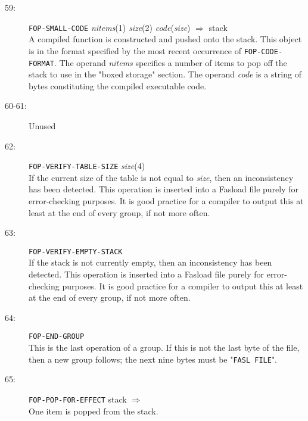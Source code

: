 \begin{description}
\item[59:] \hspace{2em} {\tt FOP-SMALL-CODE} \hspace{2em} {\it nitems}(1) \hspace{2em} {\it size}(2) \hspace{2em}
{\it code}({\it size}) \hspace{2em} $\Rightarrow$ \hspace{2em} stack \\
A compiled function is constructed and pushed onto the stack.
This object is in the format specified by the most recent
occurrence of {\tt FOP-CODE-FORMAT}.
The operand {\it nitems} specifies a number of items to pop off
the stack to use in the "boxed storage" section.  The operand {\it code}
is a string of bytes constituting the compiled executable code.

\item[60-61:] Unused

\item[62:] \hspace{2em} {\tt FOP-VERIFY-TABLE-SIZE} \hspace{2em} {\it size}(4) \\
If the current size of the table is not equal to {\it size},
then an inconsistency has been detected.  This operation
is inserted into a Fasload file purely for error-checking purposes.
It is good practice for a compiler to output this at least at the
end of every group, if not more often.

\item[63:] \hspace{2em} {\tt FOP-VERIFY-EMPTY-STACK} \\
If the stack is not currently empty,
then an inconsistency has been detected.  This operation
is inserted into a Fasload file purely for error-checking purposes.
It is good practice for a compiler to output this at least at the
end of every group, if not more often.

\item[64:] \hspace{2em} {\tt FOP-END-GROUP} \\
This is the last operation of a group.	If this is not the
last byte of the file, then a new group follows; the next
nine bytes must be "{\tt FASL FILE}".

\item[65:] \hspace{2em} {\tt FOP-POP-FOR-EFFECT} \hspace{2em} stack \hspace{2em} $\Rightarrow$ \hspace{2em} \\
One item is popped from the stack.


\end{description}
